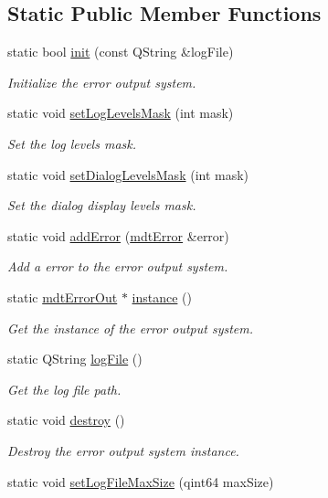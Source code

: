 \subsection*{Static Public Member Functions}
\begin{DoxyCompactItemize}
\item 
static bool \hyperlink{classmdt_error_out_a9c7f05b03d0f09ff02e8f747bdcd1de7}{init} (const QString \&logFile)
\begin{DoxyCompactList}\small\item\em Initialize the error output system. \end{DoxyCompactList}\item 
static void \hyperlink{classmdt_error_out_a547e4e8aa75528710e4a17e9faf48621}{setLogLevelsMask} (int mask)
\begin{DoxyCompactList}\small\item\em Set the log levels mask. \end{DoxyCompactList}\item 
static void \hyperlink{classmdt_error_out_afa76bdf497b750829277566ec07d44d8}{setDialogLevelsMask} (int mask)
\begin{DoxyCompactList}\small\item\em Set the dialog display levels mask. \end{DoxyCompactList}\item 
static void \hyperlink{classmdt_error_out_aeb562e93216b34e7b73aa69f42065895}{addError} (\hyperlink{classmdt_error}{mdtError} \&error)
\begin{DoxyCompactList}\small\item\em Add a error to the error output system. \end{DoxyCompactList}\item 
static \hyperlink{classmdt_error_out}{mdtErrorOut} $\ast$ \hyperlink{classmdt_error_out_a7a80480a61ca1a2704ec16d69647f739}{instance} ()
\begin{DoxyCompactList}\small\item\em Get the instance of the error output system. \end{DoxyCompactList}\item 
static QString \hyperlink{classmdt_error_out_a22f721fff4d6368a4a3d51279c6af8fa}{logFile} ()
\begin{DoxyCompactList}\small\item\em Get the log file path. \end{DoxyCompactList}\item 
static void \hyperlink{classmdt_error_out_a45c1370762b47a06ec597d6e89ebc73d}{destroy} ()
\begin{DoxyCompactList}\small\item\em Destroy the error output system instance. \end{DoxyCompactList}\item 
\hypertarget{classmdt_error_out_afd7f41eaf7e07b4fceb83297e9040e35}{
static void \hyperlink{classmdt_error_out_afd7f41eaf7e07b4fceb83297e9040e35}{setLogFileMaxSize} (qint64 maxSize)}
\label{classmdt_error_out_afd7f41eaf7e07b4fceb83297e9040e35}


\end{DoxyCompactItemize}
